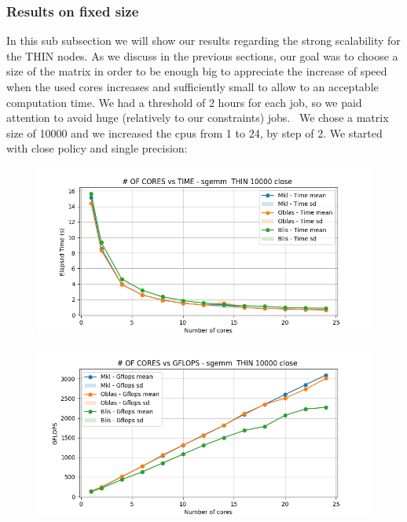 \documentclass{article}
\begin{document}
\subsubsection{Results on fixed size}
In this sub subsection we will show our results regarding the strong scalability for the THIN nodes. As we discuss in the previous sections, our goal was to choose a size of the matrix in order to be enough big to appreciate the increase of speed when the used cores increases and sufficiently small to allow to an acceptable computation time. We had a threshold of 2 hours for each job, so we paid attention to avoid huge (relatively to our constraints) jobs. \
We chose a matrix size of 10000 and we increased the cpus from 1 to 24, by step of 2.
We started with close policy and single precision:
\begin{figure}[H]
    \centering
    \includegraphics[width=\textwidth]{THIN scalability/sgemm__THIN_10000_close_time.png}
\end{figure}

\begin{figure}[H]
    \centering
    \includegraphics[width=\textwidth]{THIN scalability/sgemm__THIN_10000_close_gflops.png}
\end{figure}
\end{document}
